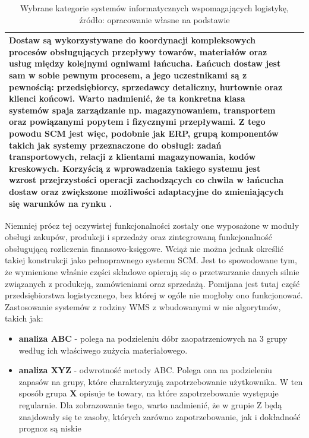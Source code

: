 \begin{table}[H]
\begin{tabular}{| l | l | p{8.5cm} |}
				Dostaw są wykorzystywane do koordynacji kompleksowych procesów obsługujących 
				przepływy towarów, materiałów oraz usług między kolejnymi ogniwami łańcucha. Łańcuch dostaw
				jest sam w sobie pewnym procesem, a jego uczestnikami są z pewnością: przedsiębiorcy,
				sprzedawcy detaliczny, hurtownie oraz klienci końcowi. Warto nadmienić, że ta konkretna 
				klasa systemów spaja zarządzanie np. magazynowaniem, transportem oraz powiązanymi
				popytem i fizycznymi przepływami. Z tego powodu SCM jest więc, podobnie jak ERP, grupą
				komponentów takich jak systemy przeznaczone do obsługi: zadań transportowych, relacji z klientami
				magazynowania, kodów kreskowych. Korzyścią z wprowadzenia takiego systemu jest wzrost
				przejrzystości operacji zachodzących co chwila w łańcucha dostaw oraz zwiększone możliwości
				adaptacyjne do zmieniających się warunków na rynku \cite{scm_system}.\\
				\hline
			\end{tabular}
			\caption[Wybrane kategorie systemów wspomagających logistykę]{
				Wybrane kategorie systemów informatycznych wspomagających logistykę,\\
				źródło: opracowanie własne na podstawie \cite{IDL}
			}
		\end{table}
		Niemniej prócz tej oczywistej funkcjonalności zostały one wyposażone w moduły obsługi zakupów, produkcji i sprzedaży oraz zintegrowaną
		funkcjonalność obsługującą rozliczenia finansowo-księgowe. Wciąż nie można jednak określić takiej
		konstrukcji jako pełnoprawnego systemu SCM. Jest to spowodowane tym, że wymienione właśnie części składowe
		opierają się o przetwarzanie danych silnie związanych z produkcją, zamówieniami oraz sprzedażą. Pomijana 
		jest tutaj część przedsiębiorstwa logistycznego, bez której w ogóle nie mogłoby ono funkcjonować.
		Zastosowanie systemów z rodziny WMS z wbudowanymi w nie algorytmów, takich jak:
		\begin{itemize}
			\item \textbf{analiza ABC} - polega na podzieleniu dóbr zaopatrzeniowych na 3 grupy według ich właściwego zużycia materiałowego.
			\item \textbf{analiza XYZ} - odwrotność metody ABC. Polega ona na podzieleniu zapasów na grupy, które charakteryzują
			zapotrzebowanie użytkownika. W ten sposób grupa \textbf{X} opisuje te towary, na które zapotrzebowanie występuje regularnie.
			Dla zobrazowanie tego, warto nadmienić, że w grupie Z będą znajdowały się te zasoby, których zarówno zapotrzebowanie, 
			jak i dokładność prognoz są niskie 
		\end{itemize}
		
